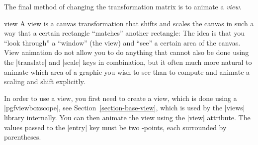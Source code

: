 The final method of changing the transformation matrix is to animate a
\emph{view.}

\begin{animateattribute}{view}
    A view is a canvas transformation that shifts and scales the canvas in such
    a way that a certain rectangle ``matches'' another rectangle: The idea is
    that you ``look through'' a ``window'' (the view) and ``see'' a certain
    area of the canvas. View animation do not allow you to do anything that
    cannot also be done using the |translate| and |scale| keys in combination,
    but it often much more natural to animate which area of a graphic you wish
    to see than to compute and animate a scaling and shift explicitly.

    In order to use a view, you first need to create a view, which is done
    using a |{pgfviewboxscope}|, see Section~\ref{section-base-view}, which is
    used by the |views| library internally. You can then animate the view using
    the |view| attribute. The values passed to the |entry| key must be two
    \pgfname-points, each surrounded by parentheses.
\begin{codeexample}[
    preamble={\usepgfmodule{animations}
\usetikzlibrary{views}},
    animation list={0.5,1,1.5,2},
    animation bb={(1.1,-0.9) rectangle (2.9,0.9)},
]
\end{codeexample}

\begin{codeexample}[
    width=2cm,
    preamble={\usepgfmodule{animations}
\usetikzlibrary{views}},
]
\end{codeexample}
\end{animateattribute}
